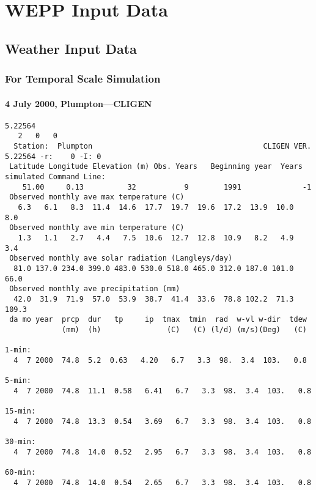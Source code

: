 \chapter{WEPP Input Data}
\label{sec:WEPPInputData}

\section{Weather Input Data}
\label{sec:WEPPWeatherInputData}

\subsection{For Temporal Scale Simulation}
\label{sec:ForTemporalScaleTests}

\subsubsection{4 July 2000, Plumpton---CLIGEN}
\label{sec:DitchlingRoadTemporalScaleSimulationCLIGEN}
\scriptsize

\begin{verbatim}
5.22564
   2   0   0
  Station:  Plumpton                                       CLIGEN VER. 5.22564 -r:    0 -I: 0
 Latitude Longitude Elevation (m) Obs. Years   Beginning year  Years simulated Command Line:
    51.00     0.13          32           9        1991              -1
 Observed monthly ave max temperature (C)
   6.3   6.1   8.3  11.4  14.6  17.7  19.7  19.6  17.2  13.9  10.0   8.0
 Observed monthly ave min temperature (C)
   1.3   1.1   2.7   4.4   7.5  10.6  12.7  12.8  10.9   8.2   4.9   3.4
 Observed monthly ave solar radiation (Langleys/day)
  81.0 137.0 234.0 399.0 483.0 530.0 518.0 465.0 312.0 187.0 101.0  66.0
 Observed monthly ave precipitation (mm)
  42.0  31.9  71.9  57.0  53.9  38.7  41.4  33.6  78.8 102.2  71.3 109.3
 da mo year  prcp  dur   tp     ip  tmax  tmin  rad  w-vl w-dir  tdew
             (mm)  (h)               (C)   (C) (l/d) (m/s)(Deg)   (C)

1-min:
  4  7 2000  74.8  5.2  0.63   4.20   6.7   3.3  98.  3.4  103.   0.8

5-min:
  4  7 2000  74.8  11.1  0.58   6.41   6.7   3.3  98.  3.4  103.   0.8

15-min:
  4  7 2000  74.8  13.3  0.54   3.69   6.7   3.3  98.  3.4  103.   0.8

30-min:
  4  7 2000  74.8  14.0  0.52   2.95   6.7   3.3  98.  3.4  103.   0.8

60-min:
  4  7 2000  74.8  14.0  0.54   2.65   6.7   3.3  98.  3.4  103.   0.8
\end{verbatim}

